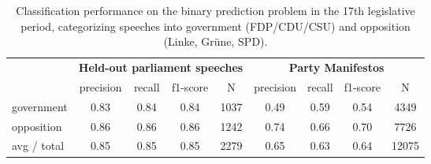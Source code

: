 \documentclass[11pt]{article}
\begin{document}
\begin{table*}[t]
\caption{
\label{tab:results_binary_17}
Classification performance on the binary prediction problem in the 17th legislative period, categorizing speeches into government (FDP/CDU/CSU) and opposition (Linke, Gr\"une, SPD).
}
\begin{center}
\begin{tabular}{lcccccccc}
& \multicolumn{4}{c}{\bf Held-out parliament speeches} & \multicolumn{4}{c}{\bf Party Manifestos}\\
    &         precision    &recall &  f1-score  & N    &         precision    &recall &  f1-score  & N\\
\hline \hline
government    &   0.83   &   0.84&      0.84     & 1037 & 0.49  &    0.59 &     0.54  &    4349\\
 opposition     &  0.86  &    0.86   &   0.86    &  1242 & 0.74 &     0.66  &    0.70   &   7726\\
\hline
avg / total   &    0.85 &     0.85 &     0.85  &    2279 & 0.65  &     0.63  &     0.64  &    12075\\

%
\end{tabular}
\end{center}
\end{table*}
\end{document}
